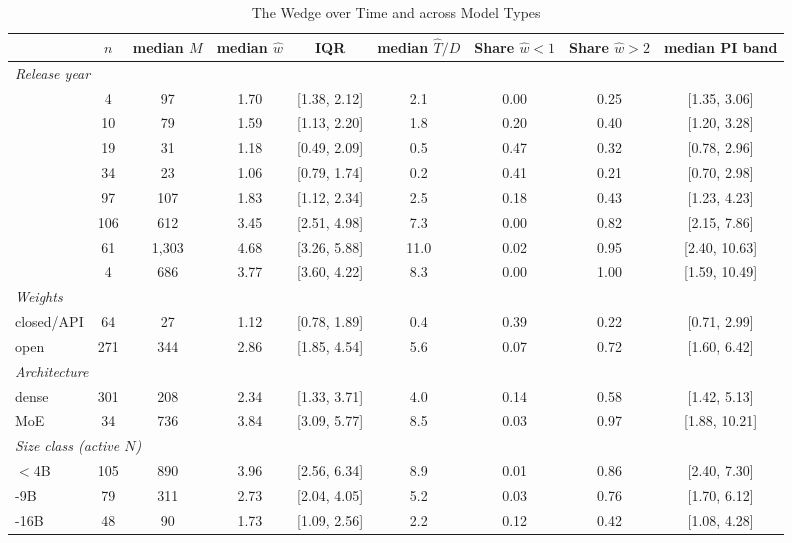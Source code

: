 \begin{table}[htbp]
\centering
\scriptsize
\begin{threeparttable}
\caption{The Wedge over Time and across Model Types}
\label{tab:m3_trends}
\begin{tabular}{@{}lcccccccc@{}}
\toprule
 & $n$ & median $M$ & median $\hat w$ & IQR & median $\hat T/D$ & Share $\hat w<1$ & Share $\hat w>2$ & median PI band \\
\midrule
\multicolumn{9}{l}{\textit{Release year}} \\
\quad 2019 & 4 & 97 & 1.70 & [1.38, 2.12] & 2.1 & 0.00 & 0.25 & [1.35, 3.06] \\
\quad 2020 & 10 & 79 & 1.59 & [1.13, 2.20] & 1.8 & 0.20 & 0.40 & [1.20, 3.28] \\
\quad 2021 & 19 & 31 & 1.18 & [0.49, 2.09] & 0.5 & 0.47 & 0.32 & [0.78, 2.96] \\
\quad 2022 & 34 & 23 & 1.06 & [0.79, 1.74] & 0.2 & 0.41 & 0.21 & [0.70, 2.98] \\
\quad 2023 & 97 & 107 & 1.83 & [1.12, 2.34] & 2.5 & 0.18 & 0.43 & [1.23, 4.23] \\
\quad 2024 & 106 & 612 & 3.45 & [2.51, 4.98] & 7.3 & 0.00 & 0.82 & [2.15, 7.86] \\
\quad 2025 & 61 & 1,303 & 4.68 & [3.26, 5.88] & 11.0 & 0.02 & 0.95 & [2.40, 10.63] \\
\quad 2026 & 4 & 686 & 3.77 & [3.60, 4.22] & 8.3 & 0.00 & 1.00 & [1.59, 10.49] \\
\multicolumn{9}{l}{\textit{Weights}} \\
\quad closed/API & 64 & 27 & 1.12 & [0.78, 1.89] & 0.4 & 0.39 & 0.22 & [0.71, 2.99] \\
\quad open & 271 & 344 & 2.86 & [1.85, 4.54] & 5.6 & 0.07 & 0.72 & [1.60, 6.42] \\
\multicolumn{9}{l}{\textit{Architecture}} \\
\quad dense & 301 & 208 & 2.34 & [1.33, 3.71] & 4.0 & 0.14 & 0.58 & [1.42, 5.13] \\
\quad MoE & 34 & 736 & 3.84 & [3.09, 5.77] & 8.5 & 0.03 & 0.97 & [1.88, 10.21] \\
\multicolumn{9}{l}{\textit{Size class (active $N$)}} \\
\quad $<$4B & 105 & 890 & 3.96 & [2.56, 6.34] & 8.9 & 0.01 & 0.86 & [2.40, 7.30] \\
\quad 4-9B & 79 & 311 & 2.73 & [2.04, 4.05] & 5.2 & 0.03 & 0.76 & [1.70, 6.12] \\
\quad 9-16B & 48 & 90 & 1.73 & [1.09, 2.56] & 2.2 & 0.12 & 0.42 & [1.08, 4.28] \\

\end{tabular}
\end{threeparttable}
\end{table}
